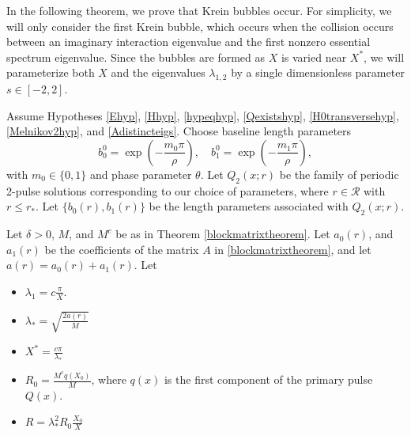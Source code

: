 \documentclass[thesis.tex]{subfiles}
\begin{document}
In the following theorem, we prove that Krein bubbles occur. For simplicity, we will only consider the first Krein bubble, which occurs when the collision occurs between an imaginary interaction eigenvalue and the first nonzero essential spectrum eigenvalue. Since the bubbles are formed as $X$ is varied near $X^*$, we will parameterize both $X$ and the eigenvalues $\lambda_{1,2}$ by a single dimensionless parameter $s \in [-2, 2]$. 

\begin{theorem}\label{theorem:kreinbubbles}
Assume Hypotheses \ref{Ehyp}, \ref{Hhyp}, \ref{hypeqhyp}, \ref{Qexistshyp}, \ref{H0transversehyp}, \ref{Melnikov2hyp}, and \ref{Adistincteigs}. Choose baseline length parameters
\[
b_0^0 = \exp\left(-\frac{m_0 \pi}{\rho}\right), \quad b_1^0 = \exp\left(-\frac{m_1 \pi}{\rho}\right),
\] 
with $m_0 \in \{ 0, 1\}$ and phase parameter $\theta$. Let $Q_2(x; r)$ be the family of periodic 2-pulse solutions corresponding to our choice of parameters, where $r \in \mathcal{R}$ with $r \leq r_*$. Let $\{ b_0(r), b_1(r) \}$ be the length parameters associated with $Q_2(x; r)$.

Let $\delta > 0$, $M$, and $M^c$ be as in Theorem \ref{blockmatrixtheorem}. Let $a_0(r)$, and $a_1(r)$ be the coefficients of the matrix $A$ in \ref{blockmatrixtheorem}, and let $a(r) = a_0(r) + a_1(r)$. Let
\begin{itemize}
\item $\lambda_1 = c \frac{\pi}{X}$.
\item $\lambda_* = \sqrt{\frac{2 a(r) }{M}}$
\item $X^* = \frac{c \pi}{\lambda_*}$
\item $R_0 = \frac{M^c q(X_0)}{M}$, where $q(x)$ is the first component of the primary pulse $Q(x)$.
\item $R = \lambda_*^2 R_0 \frac{X_0}{X}$
\end{itemize}


\end{theorem}
\end{document}
